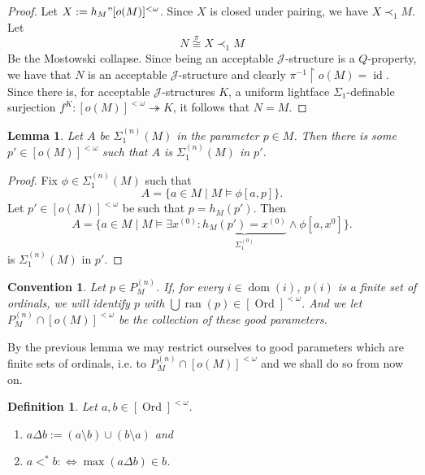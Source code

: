 \documentclass[12pt,a4paper]{article}
\theoremstyle{nicestyle}
\newtheorem{definition}{Definition}[subsection]
\newtheorem{lemma}{Lemma}[subsection]
\newtheorem{convention}{Convention}[subsection]
\DeclareMathOperator{\dom}{dom}
\DeclareMathOperator{\ran}{ran}
\DeclareMathOperator{\ord}{Ord}
\DeclareMathOperator{\id}{id}
\begin{document}
\begin{proof}
  Let $X := h_{M}" [o(M)]^{<\omega}$. Since $X$ is closed under
  pairing, we have $X \prec_{1} M$. Let
  \[
    N \overset{\pi}{\cong} X \prec_{1} M
  \]
  Be the Mostowski collapse. Since being an acceptable
  $\mathcal{J}$-structure is a $Q$-property, we have that $N$ is an
  acceptable $\mathcal{J}$-structure and clearly
  $\pi^{-1} \restriction o(M) = \id$. Since there is, for acceptable
  $\mathcal{J}$-structures $K$, a uniform lightface
  $\Sigma_{1}$-definable surjection
  $f^{K} \colon [o(M)]^{<\omega} \twoheadrightarrow K$, it follows
  that $N = M$.
\end{proof}

\begin{lemma}
  Let $A$ be $\Sigma^{(n)}_1(M)$ in the parameter $p \in M$. Then
  there is some $p' \in [o(M)]^{<\omega}$ such that $A$ is
  $\Sigma^{(n)}_{1}(M)$ in $p'$.
\end{lemma}

\begin{proof}
  Fix $\phi \in \Sigma^{(n)}_{1}(M)$ such that
  \[
    A = \{ a \in M \mid M \models \phi[a,p] \}.
  \]
  Let $p' \in [o(M)]^{< \omega}$ be such that $p = h_{M}(p')$. Then
  \[
    A = \{ a \in M \mid M \models \exists x^{(0)} \colon
    \underbrace{h_{M}(p') = x^{(0)}}_{\Sigma^{(0)}_{1}} \wedge \phi[a,
    x^{0}] \}.
  \]
  is $\Sigma^{(n)}_{1}(M)$ in $p'$.
\end{proof}

\begin{convention}
  Let $p \in P^{(n)}_{M}$. If, for every $i \in \dom(i)$, $p(i)$ is a
  finite set of ordinals, we will identify $p$ with
  $\bigcup \ran(p) \in [\ord]^{<\omega}$. And we let
  $P^{(n)}_{M} \cap [o(M)]^{<\omega}$ be the collection of these
  good parameters.
\end{convention}
  
By the previous lemma we may restrict ourselves to good parameters
which are finite sets of ordinals, i.e. to
$P^{(n)}_{M} \cap [o(M)]^{<\omega}$ and we shall do so from now on.

\begin{definition}
  Let $a,b \in [\ord]^{<\omega}$.
  \begin{enumerate}
  \item $a \Delta b := (a \setminus b) \cup (b \setminus a)$ and
  \item $a <^{*}b : \iff \max(a \Delta b) \in b$.
  \end{enumerate}
\end{definition}
\end{document}
